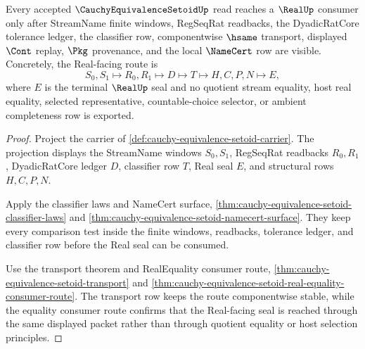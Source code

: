 \begin{theorem}
\label{thm:cauchy-equivalence-setoid-real-seal-forward-route}
Every accepted $\CauchyEquivalenceSetoidUp$ read reaches a $\RealUp$ consumer only after StreamName finite windows, RegSeqRat readbacks, the DyadicRatCore tolerance ledger, the classifier row, componentwise $\hsame$ transport, displayed $\Cont$ replay, $\Pkg$ provenance, and the local $\NameCert$ row are visible. Concretely, the Real-facing route is
$$
S_0,S_1 \longmapsto R_0,R_1 \longmapsto D \longmapsto T \longmapsto H,C,P,N \longmapsto E ,
$$
where $E$ is the terminal $\RealUp$ seal and no quotient stream equality, host real equality, selected representative, countable-choice selector, or ambient completeness row is exported.
\end{theorem}
\begin{proof}
Project the carrier of \autoref{def:cauchy-equivalence-setoid-carrier}. The projection displays the StreamName windows $S_0,S_1$, RegSeqRat readbacks $R_0,R_1$, DyadicRatCore ledger $D$, classifier row $T$, Real seal $E$, and structural rows $H,C,P,N$.

Apply the classifier laws and NameCert surface, \autoref{thm:cauchy-equivalence-setoid-classifier-laws} and \autoref{thm:cauchy-equivalence-setoid-namecert-surface}. They keep every comparison test inside the finite windows, readbacks, tolerance ledger, and classifier row before the Real seal can be consumed.

Use the transport theorem and RealEquality consumer route, \autoref{thm:cauchy-equivalence-setoid-transport} and \autoref{thm:cauchy-equivalence-setoid-real-equality-consumer-route}. The transport row keeps the route componentwise stable, while the equality consumer route confirms that the Real-facing seal is reached through the same displayed packet rather than through quotient equality or host selection principles.
\end{proof}

